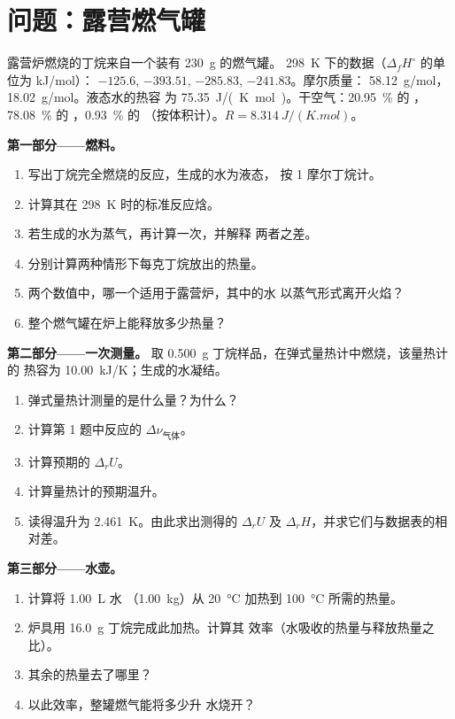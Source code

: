 \section{问题：露营燃气罐}

\begin{problem}
\label{pb:b2:reaction-enthalpy:1}
露营炉燃烧的丁烷来自一个装有 \qty{230}{g} 的燃气罐。
\qty{298}{K} 下的数据（$\Delta_f H^\circ$ 的单位为 \unit{kJ/mol}）：
$-125.6$,  $-393.51$,  $-285.83$, 
$-241.83$。摩尔质量： \qty{58.12}{g/mol}，
\qty{18.02}{g/mol}。液态水的热容
为 \qty{75.35}{J/(K.mol)}。干空气：\qty{20.95}{\percent} 的 ，
\qty{78.08}{\percent} 的 ，\qty{0.93}{\percent} 的 （按体积计）。$R = \qty{8.314}{J/(K.mol)}$。

\medskip
\noindent\textbf{第一部分——燃料。}
\begin{enumerate}
  \item 写出丁烷完全燃烧的反应，生成的水为液态，
        按 1 摩尔丁烷计。
  \item 计算其在 \qty{298}{K} 时的标准反应焓。
  \item 若生成的水为蒸气，再计算一次，并解释
        两者之差。
  \item 分别计算两种情形下每克丁烷放出的热量。
  \item 两个数值中，哪一个适用于露营炉，其中的水
        以蒸气形式离开火焰？
  \item 整个燃气罐在炉上能释放多少热量？
\end{enumerate}

\medskip
\noindent\textbf{第二部分——一次测量。}
取 \qty{0.500}{g} 丁烷样品，在弹式量热计中燃烧，该量热计的
热容为 \qty{10.00}{kJ/K}；生成的水凝结。
\begin{enumerate}[resume]
  \item 弹式量热计测量的是什么量？为什么？
  \item 计算第 1 题中反应的 $\Delta\nu_{\text{气体}}$。
  \item 计算预期的 $\Delta_r U$。
  \item 计算量热计的预期温升。
  \item 读得温升为 \qty{2.461}{K}。由此求出测得的 $\Delta_r U$
        及 $\Delta_r H$，并求它们与数据表的相对差。
\end{enumerate}

\medskip
\noindent\textbf{第三部分——水壶。}
\begin{enumerate}[resume]
  \item 计算将 \qty{1.00}{L} 水
        （\qty{1.00}{kg}）从 \qty{20}{\celsius} 加热到 \qty{100}{\celsius} 所需的热量。
  \item 炉具用 \qty{16.0}{g} 丁烷完成此加热。计算其
        效率（水吸收的热量与释放热量之比）。
  \item 其余的热量去了哪里？
  \item 以此效率，整罐燃气能将多少升
        水烧开？
\end{enumerate}


\end{problem}
